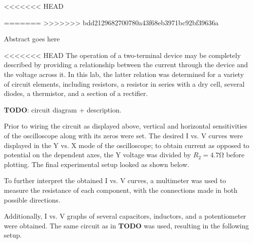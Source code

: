 
<<<<<<< HEAD
\usepackage{tikz}
\usetikzlibrary{optics}

\usepackage{verbatim}

=======
>>>>>>> bdd2129682700780a43f68eb3971bc92bf39636a
\physics

\begin{paperabs}

	Abstract goes here
	
\end{paperabs}

\begin{paper}
	
	
<<<<<<< HEAD
	The operation of a two-terminal device may be completely described by providing a relationship between the current through the device and the voltage across it. In this lab, the latter relation was determined for a variety of circuit elements, including resistors, a resistor in series with a dry cell, several diodes, a thermistor, and a section of a rectifier. 
	
	\textbf{TODO}: circuit diagram + description.
	
	Prior to wiring the circuit as displayed above, vertical and horizontal sensitivities of the oscilloscope along with its zeros were set. The desired I vs. V curves were displayed in the Y vs. X mode of the oscilloscope; to obtain current as opposed to potential on the dependent axes, the Y voltage was divided by \( R_2 = 4.7 \si{\ohm} \) before plotting. The final experimental setup looked as shown below.
	
	
	To further interpret the obtained I vs. V curves, a multimeter was used to measure the resistance of each component, with the connections made in both possible directions. 
	
	Additionally, I vs. V graphs of several capacitors, inductors, and a potentiometer were obtained. The same circuit as in \textbf{TODO} was used, resulting in the following setup.
	
	

\end{paper}
